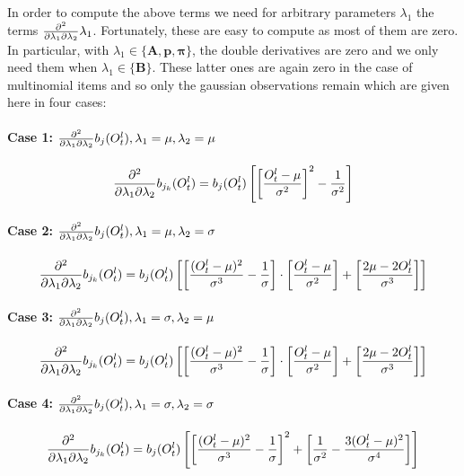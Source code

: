 \documentclass[a4paper,man,nobf]{apa}
\newcommand{\vc}{\mathbf}
\newcommand{\mat}{\mathbf}
\begin{document}
In order to compute the above terms we need for arbitrary parameters 
$\lambda_{1}$ the terms $\frac{\partial^{2}}{\partial\lambda_{1}\partial\lambda_{2}}  \lambda_{1}$. Fortunately, these are 
easy to compute as most of them are zero. In particular, with 
$\lambda_{1} \in \{\mat{A},\vc{p},\pmb{\pi} \}$, the double 
derivatives are zero and we only need them when 
$\lambda_{1}\in\{\mat{B}\}$.
These latter ones are again zero in the case of multinomial items and 
so only the gaussian observations remain which are given here in four 
cases:  

\paragraph{Case 1: $\frac{\partial^{2}}{\partial\lambda_{1}\partial\lambda_{2}} b_{j}(O_{t}^{l}), \lambda_{1}=\mu, 
\lambda_{2}=\mu$}

\begin{align} 
        \frac{\partial^{2}}{\partial\lambda_{1}\partial\lambda_{2}} b_{j_{k}}(O_{t}^{l})=b_{j}(O_{t}^{l}) \left[ \left[ 
\frac{O_{t}^{l}-\mu}{\sigma^{2}} \right]^{2} - \frac{1}{\sigma^{2}} 
\right]
\end{align}

\paragraph{Case 2: $\frac{\partial^{2}}{\partial\lambda_{1}\partial\lambda_{2}} b_{j}(O_{t}^{l}), \lambda_{1}=\mu, 
\lambda_{2}=\sigma$}

\begin{align} 
        \frac{\partial^{2}}{\partial\lambda_{1}\partial\lambda_{2}} b_{j_{k}}(O_{t}^{l})=b_{j}(O_{t}^{l}) \left[ \left[ 
\frac{(O_{t}^{l}-\mu)^{2}}{\sigma^{3}} -
	\frac{1}{\sigma}\right]  \cdot \left[ 
\frac{O_{t}^{l}-\mu}{\sigma^{2}} \right] + 
	\left[ \frac{2\mu-2O_{t}^{l}}{\sigma^{3}} \right] \right]
\end{align}


\paragraph{Case 3: $\frac{\partial^{2}}{\partial\lambda_{1}\partial\lambda_{2}} b_{j}(O_{t}^{l}), \lambda_{1}=\sigma, 
\lambda_{2}=\mu$}

\begin{align} 
        \frac{\partial^{2}}{\partial\lambda_{1}\partial\lambda_{2}} b_{j_{k}}(O_{t}^{l})=b_{j}(O_{t}^{l})  \left[ \left[ 
\frac{(O_{t}^{l}-\mu)^{2}}{\sigma^{3}} -
	\frac{1}{\sigma}\right]  \cdot \left[ 
\frac{O_{t}^{l}-\mu}{\sigma^{2}} \right] + 
	\left[ \frac{2\mu-2O_{t}^{l}}{\sigma^{3}} \right] \right]
\end{align}

\paragraph{Case 4: $\frac{\partial^{2}}{\partial\lambda_{1}\partial\lambda_{2}} b_{j}(O_{t}^{l}), \lambda_{1}=\sigma, 
\lambda_{2}=\sigma$}

\begin{align} 
        \frac{\partial^{2}}{\partial\lambda_{1}\partial\lambda_{2}} b_{j_{k}}(O_{t}^{l})=b_{j}(O_{t}^{l}) \left[ \left[ 
\frac{(O_{t}^{l}-\mu)^{2}}{\sigma^{3}} -
	\frac{1}{\sigma}\right]^{2} + \left[  \frac{1}{\sigma^{2}} - 
\frac{3(O_{t}^{l}-\mu)^{2}}{\sigma^{4}}  \right]  \right]
\end{align}

		


\end{document}
